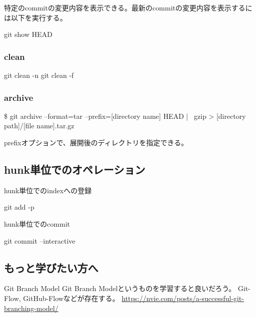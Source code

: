 \documentclass[10pt,a4j,openany,dvipdfmx]{jsarticle}
\begin{document}
特定のcommitの変更内容を表示できる。最新のcommitの変更内容を表示するには以下を実行する。
\begin{commandshell}
git show HEAD
\end{commandshell}

\subsubsection{clean} %
\label{ssub:clean}

\begin{commandshell}
git clean -n
git clean -f 
\end{commandshell}

\subsubsection{archive} %
\label{ssub:archive}

\$ git archive --format=tar --prefix=[directory name] HEAD | \
gzip > [directory path]/[file name].tar.gz

prefixオプションで、展開後のディレクトリを指定できる。

\subsection{hunk単位でのオペレーション} %
\label{sub:hunk単位でのオペレーション}

hunk単位でのindexへの登録
\begin{commandshell}
git add -p
\end{commandshell}

hunk単位でのcommit
\begin{commandshell}
git commit --interactive
\end{commandshell}


\subsection{もっと学びたい方へ} %
\label{sub:もっと学びたい方へ}


\begin{skybox}{Git Branch Model}
Git Branch Modelというものを学習すると良いだろう。
Git-Flow, GitHub-Flowなどが存在する。
\tcblower
\url{https://nvie.com/posts/a-successful-git-branching-model/}
\end{skybox}
\end{document}
